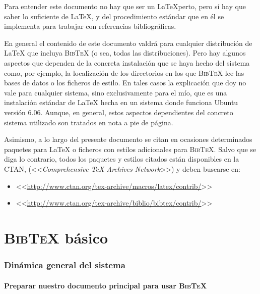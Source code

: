 \documentclass[a4paper,11pt]{article}
\def\btx-{\textsc{Bib\TeX}}
\def\ltx-{\LaTeX}
\begin{document}
Para entender este documento  no hay que ser un La\TeX perto,  pero sí hay que
saber  lo suficiente  de \ltx-,  y  del procedimiento  estándar que  en él  se
implementa para trabajar con referencias bibliográficas.

En general el  contenido de este documento valdrá  para cualquier distribución
de  \ltx- que  incluya  \btx- (o  sea,  todas las  distribuciones).  Pero  hay
algunos aspectos que dependen de la concreta instalación que se haya hecho del
sistema como, por ejemplo, la localización de los directorios en los que \btx-
lee  las  bases  de datos  o  los  ficheros  de  estilo.   En tales  casos  la
explicación que doy  no vale para cualquier sistema,  sino exclusivamente para
el mío,  que es una  instalación estándar de  \ltx- hecha en un  sistema donde
funciona Ubuntu versión 6.06.  Aunque, en general, estos aspectos dependientes
del concreto sistema utilizado son tratados en nota a pie de página.

Asimismo, a lo largo del presente documento se citan en ocasiones determinados
paquetes para \ltx-  o ficheros con estilos adicionales  para \btx-. Salvo que
se diga lo  contrario, todos los paquetes y  estilos citados están disponibles
en la  CTAN, (<<\emph{Comprehensive TeX Archives Network}>>)  y deben buscarse
en:

\begin{itemize}

\item <<\url{http://www.ctan.org/tex-archive/macros/latex/contrib/}>>

\item <<\url{http://www.ctan.org/tex-archive/biblio/bibtex/contrib/}>>

\end{itemize}

\clearpage

\part{\btx- básico}
\label{part:btx-basico}

\section{Dinámica general del sistema}
\label{sec:entender-la-dinamica}

\subsection{Preparar nuestro documento principal para usar \btx-}
\label{sec:prep-nuestro-docum}
\end{document}
